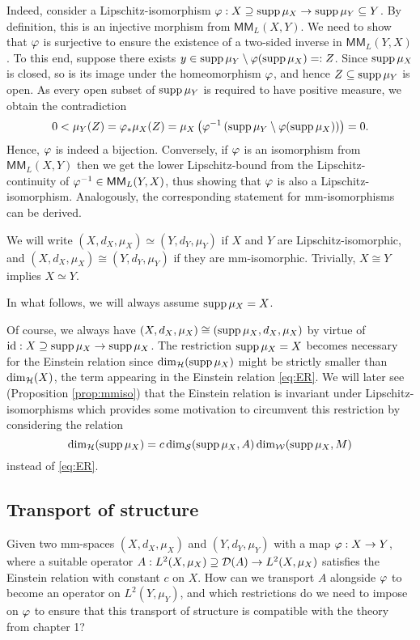 Indeed, consider a Lipschitz-isomorphism $\varphi:X\supseteq\operatorname{supp}\mu_X\to\operatorname{supp}\mu_Y\subseteq Y$. By definition, this is an injective morphism from $\mathsf{MM}_L(X,Y)$. We need to show that $\varphi$ is surjective to ensure the existence of a two-sided inverse in $\mathsf{MM}_L(Y,X)$. To this end, suppose there exists $y\in\operatorname{supp}\mu_Y\setminus \varphi(\operatorname{supp}\mu_X)=:Z$. Since $\operatorname{supp}\mu_X$ is closed, so is its image under the homeomorphism $\varphi$, and hence $Z\subseteq \operatorname{supp}\mu_Y$ is open. As every open subset of $\operatorname{supp}\mu_Y$ is required to have positive measure, we obtain the contradiction
\[
  0<\mu_Y(Z)=\varphi_*\mu_X(Z)=\mu_X\left(\varphi^{-1}\left(\operatorname{supp}\mu_Y\setminus \varphi(\operatorname{supp}\mu_X)\right)\right)=0.
\]
Hence, $\varphi$ is indeed a bijection. Conversely, if $\varphi$ is an isomorphism from $\mathsf{MM}_L(X,Y)$ then we get the lower Lipschitz-bound from the Lipschitz-continuity of $\varphi^{-1}\in\mathsf{MM}_L(Y,X)$, thus showing that $\varphi$ is also a Lipschitz-isomorphism. Analogously, the corresponding statement for mm-isomorphisms can be derived.

We will write $(X,d_X,\mu_X)\simeq (Y,d_Y,\mu_Y)$ if $X$ and $Y$ are Lipschitz-isomorphic, and 
$(X,d_X,\mu_X)\cong (Y,d_Y,\mu_Y)$ if they are mm-isomorphic. Trivially, $X\cong Y$ implies $X\simeq Y$. 

In what follows, we will always assume $\operatorname{supp}\mu_X=X$.
\begin{rem}
  Of course, we always have $(X,d_X,\mu_X)\cong(\operatorname{supp}\mu_X,d_X,\mu_X)$ by virtue of 
  $\operatorname{id}:X\supseteq\operatorname{supp}\mu_X \to\operatorname{supp}\mu_X$. The restriction $\operatorname{supp}\mu_X=X$ becomes necessary for the Einstein relation since $\dim_{\mathcal{H}}(\operatorname{supp}\mu_X)$ might be strictly smaller than $\dim_{\mathcal{H}}(X)$, the term appearing in the Einstein relation \eqref{eq:ER}. We will later see (Proposition \ref{prop:mmiso}) that the Einstein relation is invariant under Lipschitz-isomorphisms which provides some motivation to circumvent this restriction by considering the relation
  \[
    \dim_{\mathcal{H}}(\operatorname{supp}\mu_X)=c\dim_{\mathcal{S}}(\operatorname{supp}\mu_X,A)\dim_{\mathcal{W}}(\operatorname{supp}\mu_X,M)
  \]
  instead of \eqref{eq:ER}.
\end{rem}

\subsection{Transport of structure}

Given two mm-spaces $(X,d_X,\mu_X)$ and $(Y,d_Y,\mu_Y)$ with a map $\varphi:X\to Y$, where a suitable operator 
$A:L^2(X,\mu_X)\supseteq\mathcal{D}(A)\to L^2(X,\mu_X)$ satisfies the Einstein relation with constant $c$ on $X$. How can we transport $A$ alongside $\varphi$ to become an operator on $L^2(Y,\mu_Y)$, and which restrictions do we need to impose on $\varphi$ to ensure that this transport of structure is compatible with the theory from chapter 1?

